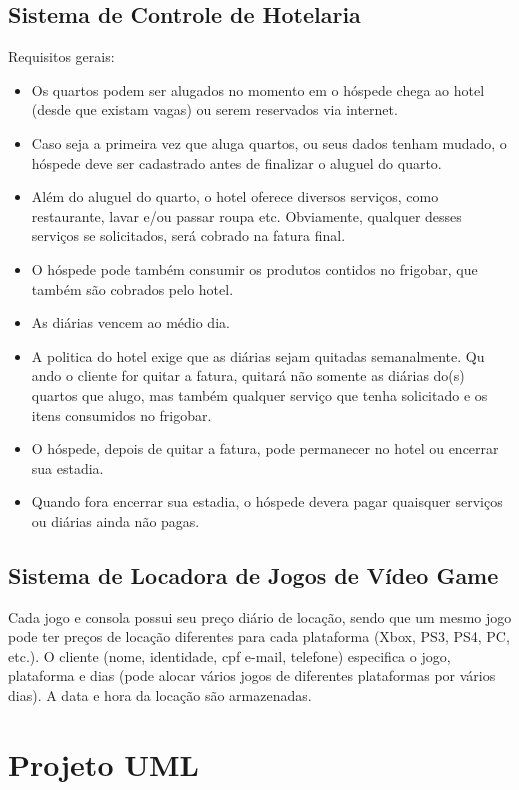 \documentclass[a4paper,10pt]{article}
\begin{document}
\subsection{Sistema de Controle de Hotelaria} 

Requisitos gerais:

\begin{itemize}
	\item Os quartos podem ser alugados no momento em o hóspede chega ao hotel (desde que existam vagas) ou serem reservados via internet.
	\item Caso seja a primeira vez que aluga quartos, ou seus dados tenham mudado, o hóspede deve ser cadastrado antes de finalizar o aluguel do quarto.
	\item Além do aluguel do quarto, o hotel oferece diversos serviços, como restaurante, lavar e/ou passar roupa etc. Obviamente, qualquer desses serviços se solicitados, será cobrado na fatura final.
	\item O hóspede pode também consumir os produtos contidos no frigobar, que também são cobrados pelo hotel.
	\item As diárias vencem ao médio dia.
	\item A politica do hotel exige que as diárias sejam quitadas semanalmente. Qu ando o cliente for quitar a fatura, quitará não somente as diárias do(s) quartos que alugo, mas também qualquer serviço que tenha solicitado e os itens consumidos no frigobar.
	\item O hóspede, depois de quitar a fatura, pode permanecer no hotel ou encerrar sua estadia.
	\item Quando fora encerrar sua estadia, o hóspede devera pagar quaisquer serviços ou diárias ainda não pagas.
\end{itemize}

\subsection{Sistema de Locadora de Jogos de Vídeo Game}

Cada jogo e consola possui seu preço diário de locação, sendo que um mesmo jogo pode ter preços de locação diferentes para cada plataforma (Xbox, PS3, PS4, PC, etc.). O cliente (nome, identidade, cpf e-mail, telefone) especifica o jogo, plataforma e dias (pode alocar vários jogos de diferentes plataformas por vários dias). A data e hora da locação são armazenadas.

\section{Projeto UML}
\end{document}
